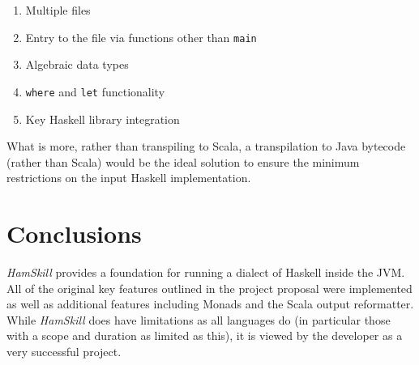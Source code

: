 \documentclass{report}
\begin{document}
\begin{enumerate}

\item Multiple files

\item Entry to the file via functions other than \texttt{main}

\item Algebraic data types

\item \texttt{where} and \texttt{let} functionality

\item Key Haskell library integration

\end{enumerate}

What is more, rather than transpiling to Scala, a transpilation to Java bytecode (rather than Scala) would be the ideal solution to ensure the minimum restrictions on the input Haskell implementation.

\section{Conclusions}

\textit{HamSkill} provides a foundation for running a dialect of Haskell inside the JVM.  All of the original key features outlined in the project proposal were implemented as well as additional features including Monads and the Scala output reformatter.  While \textit{HamSkill} does have limitations as all languages do (in particular those with a scope and duration as limited as this), it is viewed by the developer as a very successful project.

\pagebreak


\end{document}
